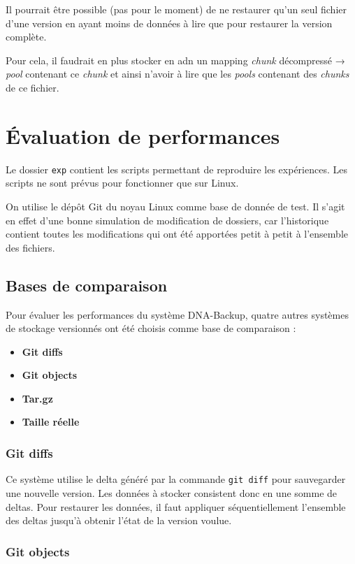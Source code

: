\documentclass[a4paper]{report}
\begin{document}
Il pourrait être possible (pas pour le moment) de ne restaurer qu'un
seul fichier d'une version en ayant moins de données à lire que pour
restaurer la version complète.

Pour cela, il faudrait en plus stocker en \ac{adn} un mapping \emph{chunk}
décompressé → \emph{pool} contenant ce \emph{chunk} et ainsi n'avoir à
lire que les \emph{pools} contenant des \emph{chunks} de ce fichier.

\chapter{Évaluation de performances}

Le dossier \verb|exp| contient les scripts permettant de reproduire
les expériences. Les scripts ne sont prévus pour fonctionner que sur
Linux.

On utilise le dépôt Git du noyau Linux comme base de donnée de test. Il
s'agit en effet d'une bonne simulation de modification de dossiers, car
l'historique contient toutes les modifications qui ont été apportées
petit à petit à l'ensemble des fichiers.

\section{Bases de comparaison}

Pour évaluer les performances du système DNA-Backup, quatre autres
systèmes de stockage versionnés ont été choisis comme base de
comparaison :

\begin{itemize}
\item
  \textbf{Git diffs}
\item
  \textbf{Git objects}
\item
  \textbf{Tar.gz}
\item
  \textbf{Taille réelle}
\end{itemize}

\subsection{Git diffs}

Ce système utilise le delta généré par la commande \verb|git diff|
pour sauvegarder une nouvelle version. Les données à stocker consistent
donc en une somme de deltas. Pour restaurer les données, il faut
appliquer séquentiellement l'ensemble des deltas jusqu'à obtenir l'état
de la version voulue.

\subsection{Git objects}
\end{document}

